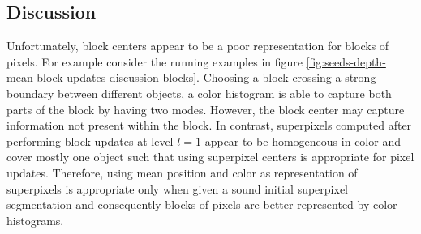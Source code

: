 \subsection{Discussion}

Unfortunately, block centers appear to be a poor representation for blocks of pixels. For example consider the running examples in figure \ref{fig:seeds-depth-mean-block-updates-discussion-blocks}. Choosing a block crossing a strong boundary between different objects, a color histogram is able to capture both parts of the block by having two modes. However, the block center may capture information not present within the block. In contrast, superpixels computed after performing block updates at level $l = 1$ appear to be homogeneous in color and cover mostly one object such that using superpixel centers is appropriate for pixel updates. Therefore, using mean position and color as representation of superpixels is appropriate only when given a sound initial superpixel segmentation and consequently blocks of pixels are better represented by color histograms.
